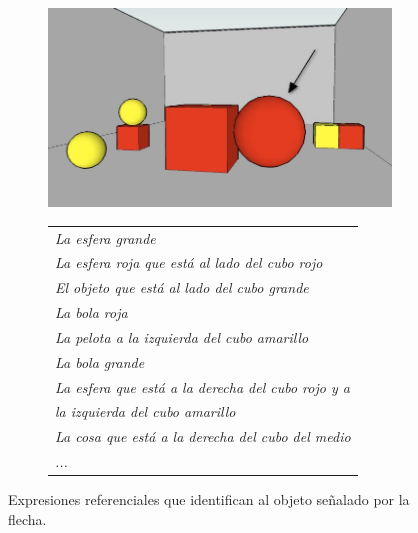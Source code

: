 \begin{figure}[H]
\begin{subfigure}{.5\textwidth}
  \centering
\includegraphics[width=\textwidth]{images/22sinletrasClaro.jpg}
  \caption{}\label{GRE3D7-stimulus1}
\end{subfigure}%
\begin{subfigure}{.5\textwidth}
 \centering
\begin{tabular}{l}
 {\it La esfera grande}\\

 {\it La esfera roja que est\'a al lado del cubo rojo} \\

 {\it El objeto que est\'a al lado del cubo grande}\\

 {\it La bola roja}\\

 {\it La pelota a la izquierda del cubo amarillo}\\

 {\it La bola grande}\\

 {\it La esfera que est\'a a la derecha del cubo rojo y a }\\
{\it la izquierda del cubo amarillo}\\

 {\it La cosa que est\'a a la derecha del cubo del medio}\\

  {\it ...}
 \end{tabular}
\hspace*{-30cm}
\centering\caption{}\label{er-figura1}
\end{subfigure}
\begin{centering}
\caption{Expresiones referenciales que identifican al objeto se\~nalado por la flecha.}
\label{figura-er}
\end{centering}
\end{figure}

